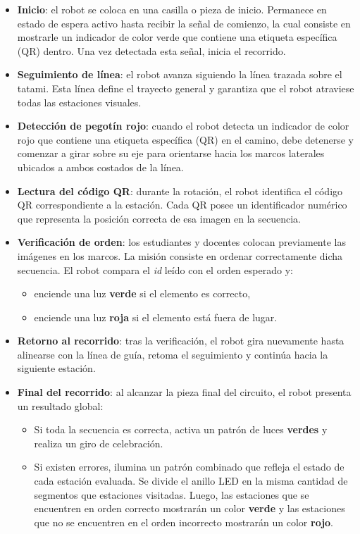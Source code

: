 \documentclass{prgrado}
\begin{document}
\begin{itemize}
    \item \textbf{Inicio}: el robot se coloca en una casilla o pieza de inicio. Permanece en estado de espera activo hasta recibir la señal de comienzo, la cual consiste en mostrarle un indicador de color verde que contiene una etiqueta específica (QR) dentro. Una vez detectada esta señal, inicia el recorrido.
    
    \item \textbf{Seguimiento de línea}: el robot avanza siguiendo la línea trazada sobre el tatami. Esta línea define el trayecto general y garantiza que el robot atraviese todas las estaciones visuales.
    
    \item \textbf{Detección de pegotín rojo}: cuando el robot detecta un indicador de color rojo que contiene una etiqueta específica (QR) en el camino, debe detenerse y comenzar a girar sobre su eje para orientarse hacia los marcos laterales ubicados a ambos costados de la línea.
    
    \item \textbf{Lectura del código QR}: durante la rotación, el robot identifica el código QR correspondiente a la estación. Cada QR posee un identificador numérico que representa la posición correcta de esa imagen en la secuencia.
    
    \item \textbf{Verificación de orden}: los estudiantes y docentes colocan previamente las imágenes en los marcos. La misión consiste en ordenar correctamente dicha secuencia. El robot compara el \emph{id} leído con el orden esperado y:
    \begin{itemize}
        \item enciende una luz \textbf{verde} si el elemento es correcto,
        \item enciende una luz \textbf{roja} si el elemento está fuera de lugar.
    \end{itemize}
    
    \item \textbf{Retorno al recorrido}: tras la verificación, el robot gira nuevamente hasta alinearse con la línea de guía, retoma el seguimiento y continúa hacia la siguiente estación.
    
    \item \textbf{Final del recorrido}: al alcanzar la pieza final del circuito, el robot presenta un resultado global:
    \begin{itemize}
        \item Si toda la secuencia es correcta, activa un patrón de luces \textbf{verdes} y realiza un giro de celebración.
        \item Si existen errores, ilumina un patrón combinado que refleja el estado de cada estación evaluada. Se divide el anillo LED en la misma cantidad de segmentos que estaciones visitadas. Luego, las estaciones que se encuentren en orden correcto mostrarán un color \textbf{verde} y las estaciones que no se encuentren en el orden incorrecto mostrarán un color \textbf{rojo}.
    \end{itemize}
    

\end{itemize}
\end{document}
